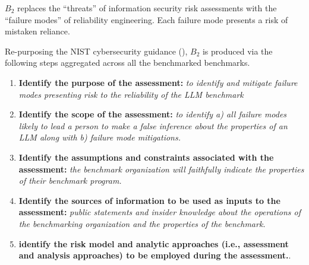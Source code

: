 \documentclass{article}
\newcommand\bb{$B_2$ }
\begin{document}
\bb replaces the ``threats'' of information security risk assessments with the ``failure modes'' of reliability engineering. Each failure mode presents a risk of mistaken reliance.


Re-purposing the NIST cybersecurity guidance (\cite{nist80030r1}), \bb is produced via the following steps aggregated across all the benchmarked benchmarks.

\begin{enumerate}
    \item {\bf Identify the purpose of the assessment:} \textit{to identify and mitigate failure modes presenting risk to the reliability of the LLM benchmark}
    \item {\bf Identify the scope of the assessment:} \textit{to identify a) all failure modes likely to lead a person to make a false inference about the properties of an LLM along with b) failure mode mitigations.}
    \item {\bf Identify the assumptions and constraints associated with the assessment:} \textit{the benchmark organization will faithfully indicate the properties of their benchmark program.}
    \item {\bf Identify the sources of information to be used as inputs to the assessment:} \textit{public statements and insider knowledge about the operations of the benchmarking organization and the properties of the benchmark.}
    \item  {\bf identify the risk model and analytic approaches (i.e., assessment and analysis approaches) to be employed during the assessment.}.
\end{enumerate}
\end{document}
